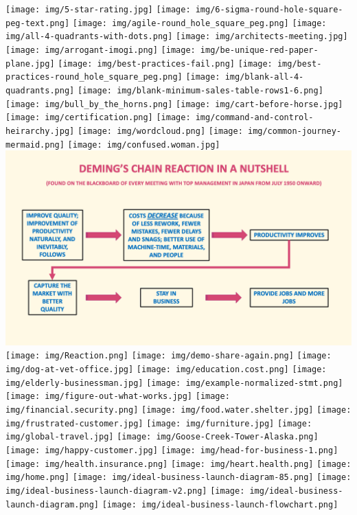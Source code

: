 \documentclass[
]{book}
\begin{document}
\texttt{[image: img/5-star-rating.jpg]}
\texttt{[image: img/6-sigma-round-hole-square-peg-text.png]}
\texttt{[image: img/agile-round\_hole\_square\_peg.png]}
\texttt{[image: img/all-4-quadrants-with-dots.png]}
\texttt{[image: img/architects-meeting.jpg]}
\texttt{[image: img/arrogant-imogi.png]}
\texttt{[image: img/be-unique-red-paper-plane.jpg]}
\texttt{[image: img/best-practices-fail.png]}
\texttt{[image: img/best-practices-round\_hole\_square\_peg.png]}
\texttt{[image: img/blank-all-4-quadrants.png]}
\texttt{[image: img/blank-minimum-sales-table-rows1-6.png]}
\texttt{[image: img/bull\_by\_the\_horns.png]}
\texttt{[image: img/cart-before-horse.jpg]}
\texttt{[image: img/certification.png]}
\texttt{[image: img/command-and-control-heirarchy.jpg]}
\texttt{[image: img/wordcloud.png]}
\texttt{[image: img/common-journey-mermaid.png]}
\texttt{[image: img/confused.woman.jpg]}
\includegraphics{img/deming-chain-reaction.png}
\texttt{[image: img/Reaction.png]}
\texttt{[image: img/demo-share-again.png]}
\texttt{[image: img/dog-at-vet-office.jpg]}
\texttt{[image: img/education.cost.png]}
\texttt{[image: img/elderly-businessman.jpg]}
\texttt{[image: img/example-normalized-stmt.png]}
\texttt{[image: img/figure-out-what-works.jpg]}
\texttt{[image: img/financial.security.png]}
\texttt{[image: img/food.water.shelter.jpg]}
\texttt{[image: img/frustrated-customer.jpg]}
\texttt{[image: img/furniture.jpg]}
\texttt{[image: img/global-travel.jpg]}
\texttt{[image: img/Goose-Creek-Tower-Alaska.png]}
\texttt{[image: img/happy-customer.jpg]}
\texttt{[image: img/head-for-business-1.png]}
\texttt{[image: img/health.insurance.png]}
\texttt{[image: img/heart.health.png]}
\texttt{[image: img/home.png]}
\texttt{[image: img/ideal-business-launch-diagram-85.png]}
\texttt{[image: img/ideal-business-launch-diagram-v2.png]}
\texttt{[image: img/ideal-business-launch-diagram.png]}
\texttt{[image: img/ideal-business-launch-flowchart.png]}
\end{document}
